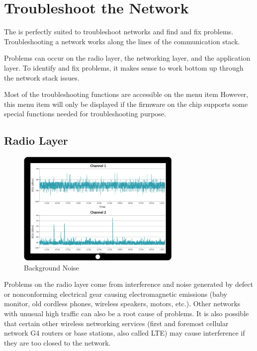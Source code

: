 \chapter{Troubleshoot the \zwave Network}
\label{c5:cit}

The \zweui is perfectly suited to troubleshoot networks and find and 
fix problems.  Troubleshooting a \zwave network works along the lines of the communication stack.

Problems can occur on the radio layer, the networking layer, and the application layer. To 
identify and fix problems, it makes sense to work bottom up through the network stack issues.

Most of the troubleshooting functions are accessible on the menu item  However, 
this menu item will only be displayed if the firmware on the \zwave chip supports some special 
functions needed for troubleshooting purpose.

\section{Radio Layer}

\begin{figure}
\begin{center}
\includegraphics[width=0.7\textwidth]{pngs/cap8/c2backgroundnoise.png}
\caption{Background Noise}
\label{c5:backgroundNoise}
\end{center}
\end{figure}

Problems on the radio layer come from interference and noise generated by defect or 
nonconforming electrical gear causing electromagnetic emissions (baby monitor, old cordless 
phones, wireless speakers, motors, etc.). Other \zwave networks with unusual high traffic 
can also be a root cause of problems. It is also possible that certain other wireless 
networking services (first and foremost cellular network G4 routers or base stations, also 
called LTE) may cause interference if they are too closed to the \zwave network.

